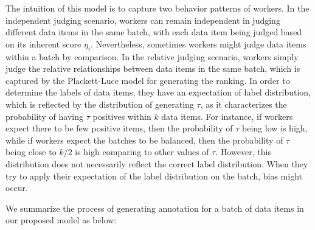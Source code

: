 
The intuition of this model is to capture two behavior patterns of workers.
In the independent judging scenario,
workers can remain independent in judging different data items in the same batch,
with each data item being judged based on its inherent score $\eta_i$.
Nevertheless, sometimes workers might judge data items 
within a batch by comparison.
In the relative judging scenario,
workers simply judge the relative 
relationships between data items in the same batch,
which is captured by the Plackett-Luce model for generating the ranking.
In order to determine the labels of data items,
they have an expectation of label distribution,
which is reflected by the distribution of generating $\tau$,
as it characterizes the probability of having $\tau$ positives within $k$ data items.
For instance, if workers expect
there to be few positive items, then the probability of $\tau$
being low is high, while if workers expect
the batches to be balanced, then the probability of $\tau$ being close to
$k/2$ is high comparing to other values of $\tau$.
However, this distribution does not necessarily 
reflect the correct label distribution.
When they try to apply their expectation 
of the label distribution on the batch, bias might occur.

We summarize the process of generating annotation for a batch of data items in our proposed model as below:

